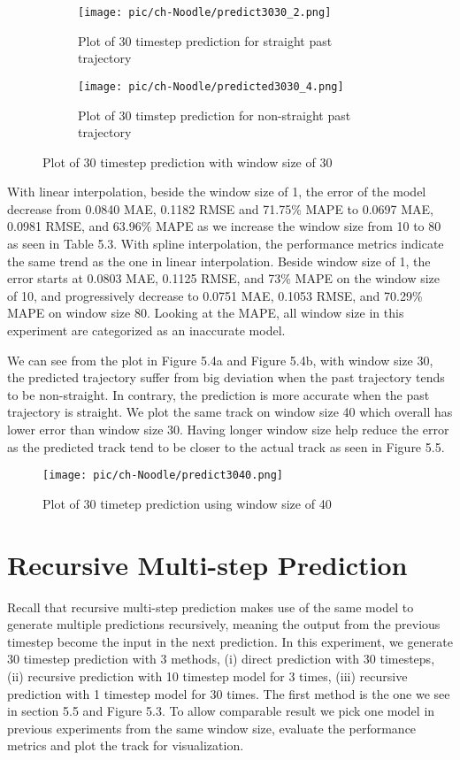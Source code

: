 \begin{figure}[t!]
\centering
\begin{subfigure}[b]{.30\textwidth}
  \centering
  \texttt{[image: pic/ch-Noodle/predict3030\_2.png]}
  \caption{Plot of 30 timestep prediction for straight past trajectory}
  \label{fig:predict3030_2}
\end{subfigure}
%
\begin{subfigure}[b]{.33\textwidth}
  \centering
  \texttt{[image: pic/ch-Noodle/predicted3030\_4.png]}
  \caption{Plot of 30 timstep prediction for non-straight past trajectory}
  \label{fig:predict3030_3}
\end{subfigure}
\caption{Plot of 30 timestep prediction with window size of 30}
\label{fig:predict3030}
\end{figure}

With linear interpolation, beside the window size of 1, the error of the model decrease from 0.0840 MAE, 0.1182 RMSE and 71.75\% MAPE to 0.0697 MAE, 0.0981 RMSE, and 63.96\% MAPE as we increase the window size from 10 to 80 as seen in Table 5.3. With spline interpolation, the performance metrics indicate the same trend as the one in linear interpolation. Beside window size of 1, the error starts at 0.0803 MAE, 0.1125 RMSE, and 73\% MAPE on the window size of 10, and progressively decrease to 0.0751 MAE, 0.1053 RMSE, and 70.29\% MAPE on window size 80. Looking at the MAPE, all window size in this experiment are categorized as an inaccurate model.

We can see from the plot in Figure 5.4a and Figure 5.4b, with window size 30, the predicted trajectory suffer from big deviation when the past trajectory tends to be non-straight. In contrary, the prediction is more accurate when the past trajectory is straight. We plot the same track on window size 40 which overall has lower error than window size 30. Having longer window size help reduce the error as the predicted track tend to be closer to the actual track as seen in Figure 5.5.

\begin{figure}[t!]
    \centering
    \texttt{[image: pic/ch-Noodle/predict3040.png]}
    \caption{Plot of 30 timetep prediction using window size of 40}
    \label{fig:predict3030_1}
\end{figure}

\section{Recursive Multi-step Prediction}
Recall that recursive multi-step prediction makes use of the same model to generate multiple predictions recursively, meaning the output from the previous timestep become the input in the next prediction. In this experiment, we generate 30 timestep prediction with 3 methods, (i) direct prediction with 30 timesteps, (ii) recursive prediction with 10 timestep model for 3 times, (iii) recursive prediction with 1 timestep model for 30 times. The first method is the one we see in section 5.5 and Figure 5.3. To allow comparable result we pick one model in previous experiments from the same window size, evaluate the performance metrics and plot the track for visualization. 

